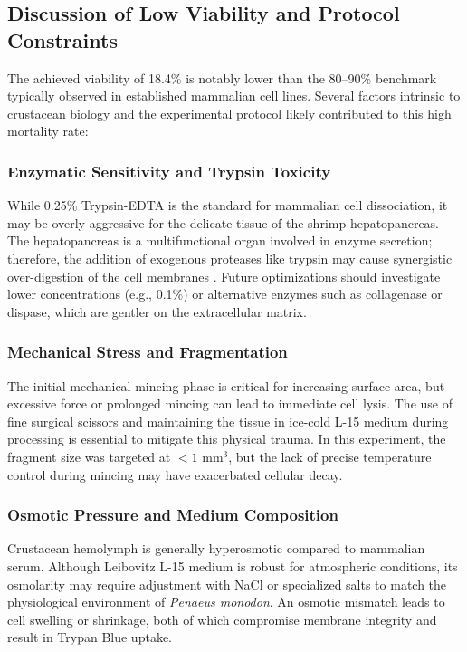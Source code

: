 \documentclass[a4paper]{article}
\begin{document}
\subsection{Discussion of Low Viability and Protocol Constraints}
The achieved viability of 18.4\% is notably lower than the 80--90\% benchmark typically observed in established mammalian cell lines. Several factors intrinsic to crustacean biology and the experimental protocol likely contributed to this high mortality rate:

\subsubsection{Enzymatic Sensitivity and Trypsin Toxicity}
While 0.25\% Trypsin-EDTA is the standard for mammalian cell dissociation, it may be overly aggressive for the delicate tissue of the shrimp hepatopancreas. The hepatopancreas is a multifunctional organ involved in enzyme secretion; therefore, the addition of exogenous proteases like trypsin may cause synergistic over-digestion of the cell membranes \cite{1}. Future optimizations should investigate lower concentrations (e.g., 0.1\%) or alternative enzymes such as collagenase or dispase, which are gentler on the extracellular matrix.

\subsubsection{Mechanical Stress and Fragmentation}
The initial mechanical mincing phase is critical for increasing surface area, but excessive force or prolonged mincing can lead to immediate cell lysis. The use of fine surgical scissors and maintaining the tissue in ice-cold L-15 medium during processing is essential to mitigate this physical trauma. In this experiment, the fragment size was targeted at $<1$ mm$^3$, but the lack of precise temperature control during mincing may have exacerbated cellular decay.

\subsubsection{Osmotic Pressure and Medium Composition}
Crustacean hemolymph is generally hyperosmotic compared to mammalian serum. Although Leibovitz L-15 medium is robust for atmospheric conditions, its osmolarity may require adjustment with NaCl or specialized salts to match the physiological environment of \textit{Penaeus monodon}. An osmotic mismatch leads to cell swelling or shrinkage, both of which compromise membrane integrity and result in Trypan Blue uptake.
\end{document}
